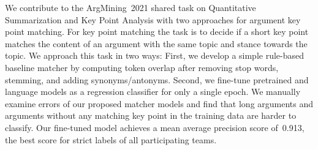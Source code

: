 We contribute to the ArgMining~2021 shared task on Quantitative Summarization and Key Point Analysis with two approaches 
for argument key point matching.
For key point matching the task is to decide if a short key point matches the content of an argument with the same topic 
and stance towards the topic.
We approach this task in two ways:
First, we develop a simple rule-based baseline matcher by computing token overlap after removing stop words, stemming, 
and adding synonyms/antonyms.
Second, we fine-tune pretrained \Bert and \Roberta language models as a regression classifier for only a single epoch.
We manually examine errors of our proposed matcher models and find that long arguments and arguments without any matching 
key point in the training data are harder to classify.
Our fine-tuned \RobertaBase model achieves a mean average precision score of~0.913, the best score for strict labels of 
all participating teams.
